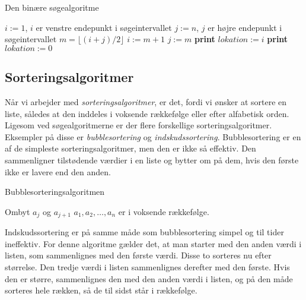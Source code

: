 \begin{algorithm}[H]
\caption{Den binære søgealgoritme}
\begin{algorithmic}[1]

    \State $i:=1$, {$i$ er venstre endepunkt i søgeintervallet}
    \State $j:=n$, {$j$ er højre endepunkt i søgeintervallet}
        \State $m=\lfloor (i+j)/2 \rfloor$
    		\State $i:=m+1$
    		\Else
    		\State $j:=m$
    		\EndIf
    \State \textbf{print} $lokation:=i$
    \Else
    \State \textbf{print} $lokation:=0$
    \EndIf
    \EndWhile  \label{roy's loop}
\EndProcedure

\end{algorithmic}
\end{algorithm}

\subsection{Sorteringsalgoritmer}
Når vi arbejder med \emph{sorteringsalgoritmer}, er det, fordi vi ønsker at sortere en liste, således at den inddeles i voksende rækkefølge eller efter alfabetisk orden. Ligesom ved søgealgoritmerne er der flere forskellige sorteringsalgoritmer. Eksempler på disse er \emph{bubblesortering} og \emph{indskudssortering}. Bubblesortering er en af de simpleste sorteringsalgoritmer, men den er ikke så effektiv. Den sammenligner tilstødende værdier i en liste og bytter om på dem, hvis den første ikke er lavere end den anden.

\begin{algorithm}[H]
\caption{Bubblesorteringsalgoritmen}
\begin{algorithmic}[1]

\EndProcedure
{}
    			\State Ombyt $a_{j}$ og $a_{j+1}$ 	
\EndIf
\EndFor
\EndFor
\State $a_{1},a_{2},\dotsc,a_{n}$ er i voksende rækkefølge. 

\end{algorithmic}
\end{algorithm}



Indskudssortering er på samme måde som bubblesortering simpel og til tider ineffektiv. For denne algoritme gælder det, at man starter med den anden værdi i listen, som sammenlignes med den første værdi. Disse to sorteres nu efter størrelse. Den tredje værdi i listen sammenlignes derefter med den første. Hvis den er større, sammenlignes den med den anden værdi i listen, og på den måde sorteres hele rækken, så de til sidst står i rækkefølge.

